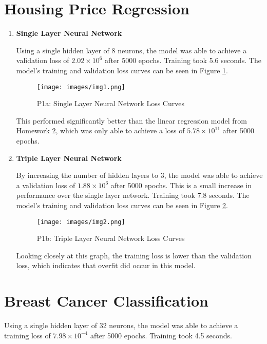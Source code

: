 \documentclass{article}
\begin{document}


\section{Housing Price Regression}
\begin{enumerate}[label=\alph*. ]
    \item \textbf{Single Layer Neural Network}
    
        Using  a single hidden layer of 8 neurons, the model was able to achieve a validation loss of $2.02 \times 10^6$ after 5000 epochs. Training took 5.6 seconds. The model's training and validation loss curves can be seen in Figure \ref{fig:P1a}.

    \begin{figure}[htbp]
        \centering
        \texttt{[image: images/img1.png]}
        \caption{P1a: Single Layer Neural Network Loss Curves}
        \label{fig:P1a}
    \end{figure}

    This performed significantly better than the linear regression model from Homework 2, which was only able to achieve a loss of $5.78 \times 10^{11}$ after 5000 epochs.

    \item \textbf{Triple Layer Neural Network}
        
    By increasing the number of hidden layers to 3, the model was able to achieve a validation loss of $1.88 \times 10^6$ after 5000 epochs. This is a small increase in performance over the single layer network. Training took 7.8 seconds. The model's training and validation loss curves can be seen in Figure \ref{fig:P1b}.

        \begin{figure}[htbp]
            \centering
            \texttt{[image: images/img2.png]}
            \caption{P1b: Triple Layer Neural Network Loss Curves}
            \label{fig:P1b}
        \end{figure}
        Looking closely at this graph, the training loss is lower than the validation loss, which indicates that overfit did occur in this model.
\end{enumerate}

\section{Breast Cancer Classification}
    Using a single hidden layer of 32 neurons, the model was able to achieve a training loss of $7.98 \times 10^{-4}$ after 5000 epochs. Training took 4.5 seconds.
\end{document}
